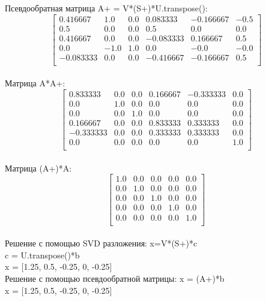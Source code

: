 \documentclass[13pt,a4paper]{scrartcl}
\begin{document}
Псевдообратная матрица A+ = V*(S+)*U.transpose():\\
$$
\left[
\begin{array}{cccccc}
0.416667&  1.0&        0.0&        0.083333& -0.166667& -0.5\\
0.5&          0.0&       0.0&        0.5&       0.0&        0.0\\
0.416667& 0.0&        0.0&       -0.083333&  0.166667&  0.5\\
0.0&       -1.0&        1.0&        0.0&       -0.0&       -0.0\\
-0.083333& 0.0&  0.0&  -0.416667& -0.166667&  0.5\\
\end{array}
\right]
$$\\

Матрица A*A+:\\
$$
\left[
\begin{array}{cccccc}
0.833333&  0.0&       0.0&    0.166667& -0.333333&  0.0\\
0.0&        1.0&        0.0&        0.0&        0.0&       0.0\\  
0.0&       0.0&        1.0&        0.0&       0.0&       0.0\\     
0.166667& 0.0&       0.0&        0.833333&  0.333333&  0.0\\     
-0.333333&  0.0&     0.0&        0.333333&  0.333333&  0.0\\      
0.0&   0.0&   0.0&  0.0&   0.0&   1.0\\
\end{array}
\right]
$$\\

Матрица (A+)*A:\\
$$
\left[
\begin{array}{ccccc}
1.0&  0.0&  0.0&  0.0& 0.0\\
0.0&  1.0&  0.0&  0.0& 0.0\\
0.0&  0.0&  1.0&  0.0& 0.0\\
0.0&  0.0&  0.0&  1.0& 0.0\\
0.0&  0.0&  0.0&  0.0& 1.0\\
\end{array}
\right]
$$\\


Решение с помощью SVD разложения: x=V*(S+)*c\\
c = U.transpose()*b\\
x = [1.25, 0.5, -0.25, 0, -0.25]\\


Решение с помощью псевдообратной матрицы: x = (A+)*b\\
x = [1.25, 0.5, -0.25, 0, -0.25]\\
\end{document}
